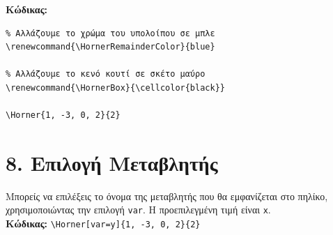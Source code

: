\documentclass{article}
\newcommand{\HornerBox}{\cellcolor{gray!15}}
\newcommand{\HornerRemainderColor}{red} %
\begin{document}
\textbf{Κώδικας:}
\begin{verbatim}
% Αλλάζουμε το χρώμα του υπολοίπου σε μπλε
\renewcommand{\HornerRemainderColor}{blue}

% Αλλάζουμε το κενό κουτί σε σκέτο μαύρο
\renewcommand{\HornerBox}{\cellcolor{black}}

\Horner{1, -3, 0, 2}{2}
\end{verbatim}

\renewcommand{\HornerRemainderColor}{blue}
\renewcommand{\HornerBox}{\cellcolor{black}}


\section*{8. Επιλογή Μεταβλητής}
Μπορείς να επιλέξεις το όνομα της μεταβλητής που θα εμφανίζεται στο πηλίκο, χρησιμοποιώντας την επιλογή \texttt{var}. Η προεπιλεγμένη τιμή είναι \texttt{x}. \\
\textbf{Κώδικας:} \verb|\Horner[var=y]{1, -3, 0, 2}{2}| \\
\end{document}
